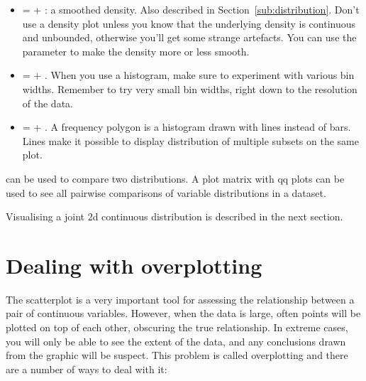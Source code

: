 \begin{itemize}
  \item {} =  + : a smoothed density.  Also described in Section~\ref{sub:distribution}.  Don't use a density plot unless you know that the underlying density is continuous and unbounded, otherwise you'll get some strange artefacts. You can use the  parameter to make the density more or less smooth.
  
    

  \item {} =  + .  When you use a histogram, make sure to experiment with various bin widths.  Remember to try very small bin widths, right down to the resolution of the data.  
  
  \item {} =  + .  A frequency polygon is a histogram drawn with lines instead of bars.  Lines make it possible to display distribution of multiple subsets on the same plot.
\end{itemize}

 can be used to compare two distributions.  A plot matrix with qq plots can be used to see all pairwise comparisons of variable distributions in a dataset.

Visualising a joint 2d continuous distribution is described in the next section.

\section{Dealing with overplotting}
\label{sec:overplotting}

The scatterplot is a very important tool for assessing the relationship between a pair of continuous variables.  However, when the data is large, often points will be plotted on top of each other, obscuring the true relationship.  In extreme cases, you will only be able to see the extent of the data, and any conclusions drawn from the graphic will be suspect.  This problem is called overplotting and there are a number of ways to deal with it:

